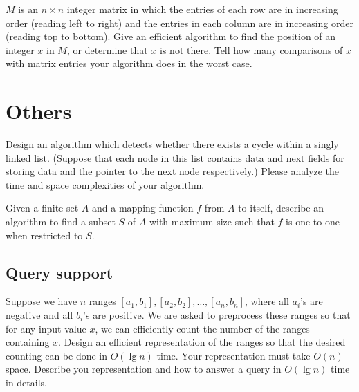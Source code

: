 \begin{Exercise}
$M$ is an $n \times n$ integer matrix in which the entries of each row are in increasing order (reading left to right) and the entries in each column are in increasing order (reading top to bottom). Give an efficient algorithm to find the position of an integer $x$ in $M$, or determine that $x$ is not there. Tell how many comparisons of $x$ with matrix entries your algorithm does in the worst case. 
\end{Exercise}
\begin{Answer}
\end{Answer}


\section{Others}

\begin{Exercise}
Design an algorithm which detects whether there exists a cycle within a singly linked list. (Suppose that each node in this list contains data and next fields for storing data and the pointer to the next node respectively.) Please analyze the time and space complexities of your algorithm. 
\end{Exercise}
\begin{Answer}
\end{Answer}

\begin{Exercise}
Given a finite set $A$ and a mapping function $f$ from $A$ to itself, describe an algorithm to find a subset $S$ of $A$ with maximum size such that $f$ is one-to-one when restricted to $S$.
\end{Exercise}
\begin{Answer}
\end{Answer}

\subsection{Query support}

\begin{Exercise}
Suppose we have $n$ ranges $[a_1, b_1], [a_2, b_2], \dots, [a_n, b_n]$, where all $a_i$'s are negative and all $b_i$'s are positive. We are asked to preprocess these ranges so that for any input value $x$, we can efficiently count the number of the ranges containing $x$. Design an efficient representation of the ranges so that the desired counting can be done in $O(\lg n)$ time. Your representation must take $O(n)$ space. Describe you representation and how to answer a query in $O(\lg n)$ time in details. 
\end{Exercise}
\begin{Answer}
\end{Answer}

